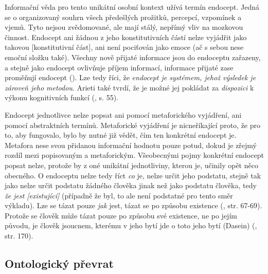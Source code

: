 \documentclass[11pt,a4paper]{article}
\begin{document}
Informační věda pro tento unikátní osobní kontext užívá termín endocept. Jedná se o organizovaný souhrn všech předešlých prožitků, percepcí, vzpomínek a vjemů. Tyto nejsou zvědomované, ale mají stálý, nepřímý vliv na mozkovou činnost. Endocept ani žádnou z jeho konstitutivních částí nelze vyjádřit jako takovou [konstitutivní část], ani není pociťován jako emoce (ač s sebou nese emoční složku také). Všechny nově přijaté informace jsou do endoceptu zařazeny, a stejně jako endocept ovlivňuje příjem informací, informace přijaté zase proměňují endocept (\cite{cejpek_informace_2006, arieti_creativity_1976}). Lze tedy říci, že \textit{endocept je systémem, jehož výsledek je zároveň jeho metodou}. Arieti také tvrdí, že je možné jej pokládat za \textit{dispozici} k výkonu kognitivních funkcí (\cite{arieti_creativity_1976}, s. 55).

Endocept jednotlivce nelze popsat ani pomocí metaforického vyjádření, ani pomocí abstraktních termínů. Metaforické vyjádření je nicneříkající proto, že pro to, aby fungovalo, bylo by nutné již vědět, čím ten konkrétní endocept je. Metafora nese svou přidanou informační hodnotu pouze potud, dokud je zřejmý rozdíl mezi popisovaným a metaforickým. Všeobecnými pojmy konkrétní endocept popsat nelze, protože by z oné unikátní jednotliviny, kterou je, učinily opět něco obecného. O endoceptu nelze tedy říct \textit{co} je, nelze určit jeho podstatu, stejně tak jako nelze určit podstatu žádného člověka jinak než jako podstatu člověka, tedy \textit{že jest [existující]} (případně že byl, to ale není podstatné pro tento směr výkladu). Lze se tázat pouze \textit{jak} jest, tázat se po způsobu existence (\cite{petricek_uvod_1992}, str. 67-69). Protože se člověk může tázat pouze po způsobu své existence, ne po jejím původu, je člověk jsoucnem, kterému v jeho bytí jde o toto jeho bytí (Dasein) (\cite{heidegger_byti_2002}, str. 170).


\subsection{Ontologický převrat}
\end{document}
